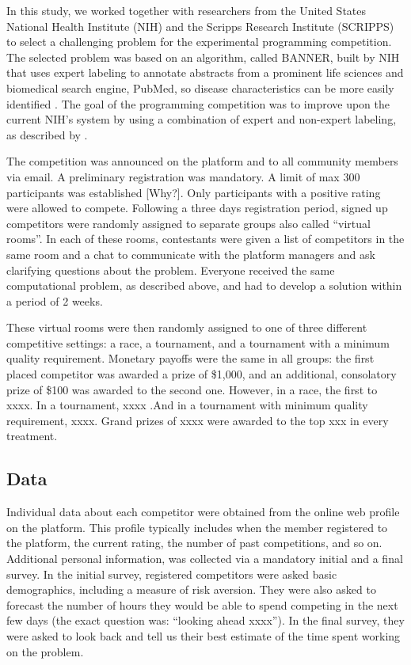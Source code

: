 \documentclass[12pt,]{article}
\begin{document}
In this study, we worked together with researchers from the United
States National Health Institute (NIH) and the Scripps Research
Institute (SCRIPPS) to select a challenging problem for the experimental
programming competition. The selected problem was based on an algorithm,
called BANNER, built by NIH that uses expert labeling to annotate
abstracts from a prominent life sciences and biomedical search engine,
PubMed, so disease characteristics can be more easily identified
\citep[see][]{leaman2008banner}. The goal of the programming competition
was to improve upon the current NIH's system by using a combination of
expert and non-expert labeling, as described by
\citet{good2014microtask}.

The competition was announced on the platform and to all community
members via email. A preliminary registration was mandatory. A limit of
max 300 participants was established {[}Why?{]}. Only participants with
a positive rating were allowed to compete. Following a three days
registration period, signed up competitors were randomly assigned to
separate groups also called ``virtual rooms''. In each of these rooms,
contestants were given a list of competitors in the same room and a chat
to communicate with the platform managers and ask clarifying questions
about the problem. Everyone received the same computational problem, as
described above, and had to develop a solution within a period of 2
weeks.

These virtual rooms were then randomly assigned to one of three
different competitive settings: a race, a tournament, and a tournament
with a minimum quality requirement. Monetary payoffs were the same in
all groups: the first placed competitor was awarded a prize of \$1,000,
and an additional, consolatory prize of \$100 was awarded to the second
one. However, in a race, the first to xxxx. In a tournament, xxxx .And
in a tournament with minimum quality requirement, xxxx. Grand prizes of
xxxx were awarded to the top xxx in every treatment.

\subsection{Data}\label{data}

Individual data about each competitor were obtained from the online web
profile on the platform. This profile typically includes when the member
registered to the platform, the current rating, the number of past
competitions, and so on. Additional personal information, was collected
via a mandatory initial and a final survey. In the initial survey,
registered competitors were asked basic demographics, including a
measure of risk aversion. They were also asked to forecast the number of
hours they would be able to spend competing in the next few days (the
exact question was: ``looking ahead xxxx''). In the final survey, they
were asked to look back and tell us their best estimate of the time
spent working on the problem.
\end{document}
